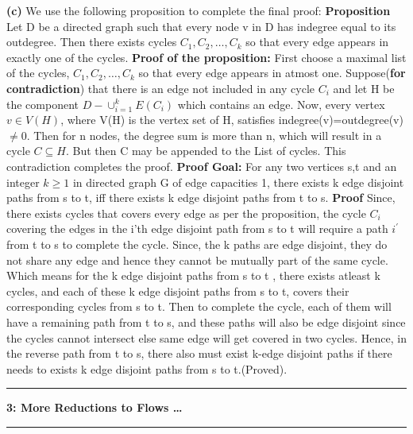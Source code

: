 \documentclass{article}
\newcommand\question[2]{\vspace{.25in}\hrule\textbf{#1: #2}\hrule\vspace{.10in}}
\renewcommand\part[1]{\vspace{.10in}\textbf{(#1)}}
\begin{document}
   \part{c} We use the following proposition to complete the final proof: \newline
   \textbf {Proposition} Let D be a directed graph such that every node v in D has indegree equal to its outdegree. Then there exists cycles $C_1, C_2, \dots, C_k$ so that every edge appears in exactly one of the cycles. \newline
   \textbf {Proof of the proposition:} First choose a maximal list of the cycles, $C_1,C_2,\dots,C_k$ so that every edge appears in atmost one. Suppose(\textbf {for contradiction}) that there is an edge not included in any cycle $C_i$ and let H be the component $D - \cup_{i=1}^kE(C_i)$ which contains an edge. Now, every vertex $v \in V(H)$, where V(H) is the vertex set of H, satisfies indegree(v)=outdegree(v)$\neq 0$. Then for n nodes, the degree sum is more than n, which will result in a cycle $C \subseteq H$. But then C may be appended to the List of cycles. This contradiction completes the proof. \newline
   \textbf {Proof Goal: } For any two vertices s,t and an integer $k \geq 1$ in directed graph G of edge capacities 1, there exists k edge disjoint paths from s to t, iff there exists k edge disjoint paths from t to s. \newline
   \textbf {Proof} Since, there exists cycles that covers every edge as per the proposition, the cycle $C_i$ covering the edges in the i'th edge disjoint path from s to t will require a path $i^\prime$ from t to s to complete the cycle. Since, the k paths are edge disjoint, they do not share any edge and hence they cannot be mutually part of the same cycle. Which means for the k edge disjoint paths from s to t , there exists atleast k cycles, and each of these k edge disjoint paths from s to t, covers their corresponding cycles from s to t. Then to complete the cycle, each of them will have a remaining path from t to s, and these paths will also be edge disjoint since the cycles cannot intersect else same edge will get covered in two cycles. Hence, in the reverse path from t to s, there also must exist k-edge disjoint paths if there needs to exists k edge disjoint paths from s to t.(Proved). \newline


   \question{3}{More Reductions to Flows \dots}
\end{document}
